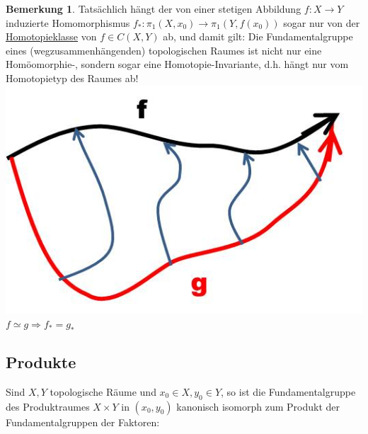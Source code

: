 \documentclass[a4paper,11pt,notitlepage]{report}
\theoremstyle{definition}
\newtheorem{remark}{Bemerkung}[chapter]
\begin{document}
\begin{remark}
	Tatsächlich hängt der von einer stetigen Abbildung $f \colon X \rightarrow Y$ induzierte Homomorphismus $f_* \colon \pi_1(X,x_0) \rightarrow \pi_1(Y,f(x_0))$ sogar nur von der \underline{Homotopieklasse} von $f \in C(X,Y)$ ab, und damit gilt:
	\newline
	Die Fundamentalgruppe eines (wegzusammenhängenden) topologischen Raumes ist nicht nur eine Homöomorphie-, sondern sogar eine Homotopie-Invariante, d.h. hängt nur vom Homotopietyp des Raumes ab! \newline
	\includegraphics[scale=0.4]{images/f_g_homotop.jpg}
	\newline
	$f \simeq g \Rightarrow f_* = g_*$
\end{remark}

\newpage
\subsection{Produkte}
\begin{theorem}
	Sind $X,Y$ topologische Räume und $x_0 \in X, y_0 \in Y$, so ist die Fundamentalgruppe des Produktraumes $X \times Y$ in $(x_0,y_0)$ kanonisch isomorph zum Produkt der Fundamentalgruppen der Faktoren:
	\begin{center}
	\end{center}
\end{theorem}
\end{document}
